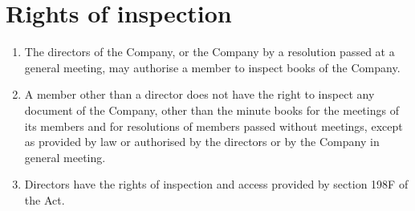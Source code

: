 \section{Rights of inspection}

\begin{enumerate}[label=(\alph*)]
    \item The directors of the Company, or the Company by a resolution passed at a general meeting, may authorise a member to inspect books of the Company.
    
    \item A member other than a director does not have the right to inspect any document of the Company, other than the minute books for the meetings of its members and for resolutions of members passed without meetings, except as provided by law or authorised by the directors or by the Company in general meeting.
    
    \item Directors have the rights of inspection and access provided by section 198F of the Act.
\end{enumerate} 